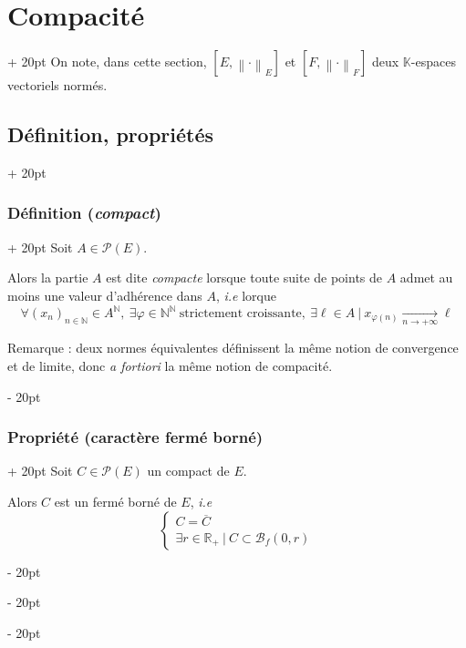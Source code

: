 \documentclass[a4paper, 12pt, twoside]{article}
\newcommand{\N}{\mathbb{N}} %
\newcommand{\R}{\mathbb{R}} %
\newcommand{\K}{\mathbb K}
\newcommand{\cj}[1]{\overline{#1}} %
\newcommand{\tendsto}[1]{\xrightarrow[#1]{}}
\newcommand{\lr}[1]{\left( #1 \right)}
\newcommand{\norm}[1]{\left\lVert #1 \right\rVert}
\newcommand{\ind}[1][20pt]{\advance\leftskip + #1}
\newcommand{\deind}[1][20pt]{\advance\leftskip - #1}
\newenvironment{indt}[2][20pt]{#2 \par \ind[#1]}{\par \deind} %
\begin{document}
    \vspace{12pt}
    
    \begin{indt}{\section{Compacité}}
        On note, dans cette section, $[E, \norm \cdot _E]$ et $[F, \norm \cdot _F]$ deux $\K$-espaces vectoriels normés.

        \begin{indt}{\subsection{Définition, propriétés}}
            \begin{indt}{\subsubsection{Définition (\textit{compact})}}
                Soit $A \in \mathcal P(E)$.

                Alors la partie $A$ est dite \emph{compacte} lorsque toute suite de points de $A$ admet au moins une valeur d'adhérence dans $A$, \textit{i.e} lorque
                \[
                    \forall \lr{x_n}_{n \in \N} \in A^\N,\
                    \exists \varphi \in \N^\N\ \text{strictement croissante},\
                    \exists \ell \in A\ |\
                    x_{\varphi(n)} \tendsto{n \to +\infty} \ell
                \]

                \vspace{6pt}
                
                Remarque : deux normes équivalentes définissent la même notion de convergence et de limite, donc \textit{a fortiori} la même notion de compacité.
            \end{indt}

            \vspace{12pt}
            
            \begin{indt}{\subsubsection{Propriété (caractère fermé borné)}}
                Soit $C \in \mathcal P(E)$ un compact de $E$.

                Alors $C$ est un fermé borné de $E$, \textit{i.e}
                \[
                    \begin{cases}
                        C = \cj C
                        \\
                        \exists r \in \R_+\ |\ C \subset \mathscr B_f(0, r)
                    \end{cases}
                \]
            \end{indt}


\end{indt}
\end{indt}
\end{document}
